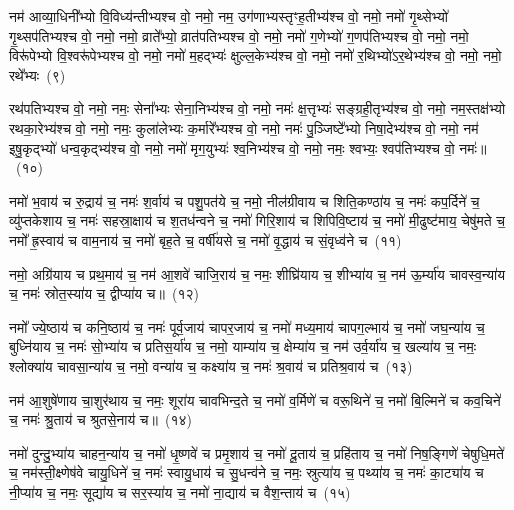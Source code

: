 {\anuvakamend[{कु॒लु॒ञ्चानां॒ पत॑ये॒ नमो॒ नमो\-ऽश्व॑पतिभ्य॒स्त्रीणि॑ च}]}%

नम॑ आव्या॒धिनी᳚भ्यो वि॒विध्य॑न्तीभ्यश्च वो॒ नमो॒ नम॒ उग॑णाभ्यस्तृꣳह॒तीभ्य॑श्च वो॒ नमो॒ नमो॑ गृ॒थ्सेभ्यो॑ गृ॒थ्सप॑तिभ्यश्च वो॒ नमो॒ नमो॒ व्राते᳚भ्यो॒ व्रात॑पतिभ्यश्च वो॒ नमो॒ नमो॑ ग॒णेभ्यो॑ ग॒णप॑तिभ्यश्च वो॒ नमो॒ नमो॒ विरू॑पेभ्यो वि॒श्वरू॑पेभ्यश्च वो॒ नमो॒ नमो॑ म॒हद्भ्यः॑ क्षुल्ल॒केभ्य॑श्च वो॒ नमो॒ नमो॑ र॒थिभ्यो॑\-ऽर॒थेभ्य॑श्च वो॒ नमो॒ नमो॒ रथे᳚भ्यः~(९)

रथ॑पतिभ्यश्च वो॒ नमो॒ नमः॒ सेना᳚भ्यः सेना॒निभ्य॑श्च वो॒ नमो॒ नमः॑ क्ष॒त्तृभ्यः॑ सङ्ग्रही॒तृभ्य॑श्च वो॒ नमो॒ नम॒स्तक्ष॑भ्यो रथका॒रेभ्य॑श्च वो॒ नमो॒ नमः॒ कुला॑लेभ्यः क॒र्मारे᳚भ्यश्च वो॒ नमो॒ नमः॑ पु॒ञ्जिष्टे᳚भ्यो निषा॒देभ्य॑श्च वो॒ नमो॒ नम॑ इषु॒कृद्भ्यो॑ धन्व॒कृद्भ्य॑श्च वो॒ नमो॒ नमो॑ मृग॒युभ्यः॑ श्व॒निभ्य॑श्च वो॒ नमो॒ नमः॒ श्वभ्यः॒ श्वप॑तिभ्यश्च वो॒ नमः॑॥~(१०)

{\anuvakamend[{रथे᳚भ्यः॒ श्वप॑तिभ्यश्च॒ द्वे च॑}]}%

नमो॑ भ॒वाय॑ च रु॒द्राय॑ च॒ नमः॑ श॒र्वाय॑ च पशु॒पत॑ये च॒ नमो॒ नील॑ग्रीवाय च शिति॒कण्ठा॑य च॒ नमः॑ कप॒र्दिने॑ च॒ व्यु॑प्तकेशाय च॒ नमः॑ सहस्रा॒क्षाय॑ च श॒तध॑न्वने च॒ नमो॑ गिरि॒शाय॑ च शिपिवि॒ष्टाय॑ च॒ नमो॑ मी॒ढुष्ट॑माय॒ चेषु॑मते च॒ नमो᳚ ह्र॒स्वाय॑ च वाम॒नाय॑ च॒ नमो॑ बृह॒ते च॒ वर्\mbox{}षी॑यसे च॒ नमो॑ वृ॒द्धाय॑ च सं॒वृध्व॑ने च~(११)

नमो॒ अग्रि॑याय च प्रथ॒माय॑ च॒ नम॑ आ॒शवे॑ चाजि॒राय॑ च॒ नमः॒ शीघ्रि॑याय च॒ शीभ्या॑य च॒ नम॑ ऊ॒र्म्या॑य चावस्व॒न्या॑य च॒ नमः॑ स्रोत॒स्या॑य च॒ द्वीप्या॑य च॥~(१२)

{\anuvakamend[{सं॒ वृध्व॑ने च॒ पञ्च॑विꣳशतिश्च}]}%

नमो᳚ ज्ये॒ष्ठाय॑ च कनि॒ष्ठाय॑ च॒ नमः॑ पूर्व॒जाय॑ चापर॒जाय॑ च॒ नमो॑ मध्य॒माय॑ चापग॒ल्भाय॑ च॒ नमो॑ जघ॒न्या॑य च॒ बुध्नि॑याय च॒ नमः॑ सो॒भ्या॑य च प्रतिस॒र्या॑य च॒ नमो॒ याम्या॑य च॒ क्षेम्या॑य च॒ नम॑ उर्व॒र्या॑य च॒ खल्या॑य च॒ नमः॒ श्लोक्या॑य चावसा॒न्या॑य च॒ नमो॒ वन्या॑य च॒ कक्ष्या॑य च॒ नमः॑ श्र॒वाय॑ च प्रतिश्र॒वाय॑ च~(१३)

नम॑ आ॒शुषे॑णाय चा॒शुर॑थाय च॒ नमः॒ शूरा॑य चावभिन्द॒ते च॒ नमो॑ व॒र्मिणे॑ च वरू॒थिने॑ च॒ नमो॑ बि॒ल्मिने॑ च कव॒चिने॑ च॒ नमः॑ श्रु॒ताय॑ च श्रुतसे॒नाय॑ च॥~(१४)

{\anuvakamend[{प्र॒ति॒श्र॒वाय॑ च॒ पञ्च॑विꣳशतिश्च}]}%

नमो॑ दुन्दु॒भ्या॑य चाहन॒न्या॑य च॒ नमो॑ धृ॒ष्णवे॑ च प्रमृ॒शाय॑ च॒ नमो॑ दू॒ताय॑ च॒ प्रहि॑ताय च॒ नमो॑ निष॒ङ्गिणे॑ चेषुधि॒मते॑ च॒ नम॑स्ती॒क्ष्णेष॑वे चायु॒धिने॑ च॒ नमः॑ स्वायु॒धाय॑ च सु॒धन्व॑ने च॒ नमः॒ स्रुत्या॑य च॒ पथ्या॑य च॒ नमः॑ का॒ट्या॑य च नी॒प्या॑य च॒ नमः॒ सूद्या॑य च सर॒स्या॑य च॒ नमो॑ ना॒द्याय॑ च वैश॒न्ताय॑ च~(१५)

